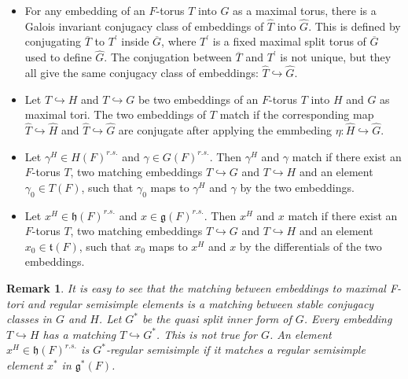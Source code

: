 \documentclass[11pt, oneside,reqno]{amsart}   	%
\newtheorem*{remark}{Remark}
\begin{document}
\begin{itemize}
  \item For any embedding of an $F$-torus $T$ into $G$ as  a maximal torus, there is a Galois invariant conjugacy class of embeddings of $\widehat{T}$ into $\widehat{G}$. This is defined by conjugating $\overline{T}$ to $T^{\prime}$ inside $\overline{G}$, where $T^{\prime}$ is a fixed maximal split torus of $\overline{G}$ used to define $\widehat{G}$. The conjugation between $\overline{T}$ and $T^{\prime}$ is not unique, but they all give the same conjugacy class of embeddings: $\widehat{T} \hookrightarrow \widehat{G}$.

  \item Let $T \hookrightarrow H$ and $T \hookrightarrow G$ be two embeddings of an $F$-torus $T$ into $H$ and $G$ as maximal tori. The two embeddings of $T$ match if the corresponding map $\widehat{T} \hookrightarrow \widehat{H}$ and $\widehat{T} \hookrightarrow \widehat{G}$ are conjugate after applying the emmbeding $\eta: \widehat{H} \hookrightarrow \widehat{G}$.
  
  \item Let $\gamma^H \in H(F)^{r.s.}$ and $\gamma \in G(F)^{r.s.}$. Then $\gamma^H$ and $\gamma$ match if there exist an $F$-torus $T$, two matching embeddings $T \hookrightarrow G$ and $T \hookrightarrow H$ and an element $\gamma_0 \in T(F)$, such that $\gamma_0$ maps to $\gamma^H$ and $\gamma$ by the two embeddings.
  
  \item Let $x^H \in \mathfrak{h}(F)^{r.s.}$ and $x \in \mathfrak{g}(F)^{r.s.}$. Then $x^H$ and $x$ match if there exist an $F$-torus $T$, two matching embeddings $T \hookrightarrow G$ and $T \hookrightarrow H$ and an element $x_0 \in \mathfrak{t}(F)$, such that $x_0$ maps to $x^H$ and $x$ by the differentials of the two embeddings.
  
\end{itemize}


\begin{remark}
It is easy to see that the matching between embeddings to maximal F-tori and regular semisimple elements is a matching between stable conjugacy classes in $G$ and $H$. Let $G^*$ be the quasi split inner form of $G$. Every embedding $T \hookrightarrow H$ has a matching $T \hookrightarrow G^*$. This is not true for $G$. An element $x^H \in \mathfrak{h}(F)^{r.s.}$ is $G^*$-regular semisimple if it matches a regular semisimple element $x^*$ in $\mathfrak{g^*}(F)$.
\end{remark}
\end{document}
